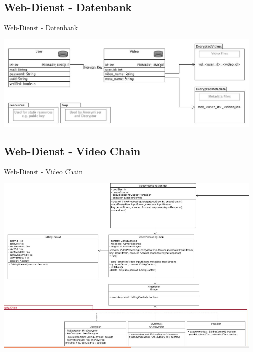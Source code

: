 \documentclass[19pt]{beamer}
\begin{document}
\subsection{Web-Dienst - Datenbank}
\begin{frame}{Web-Dienst - Datenbank}
\begin{center}
\includegraphics[scale=0.3]{resources/database_scheme.jpg}
\end{center}
\end{frame}
\subsection{Web-Dienst - Video Chain}
\begin{frame}{Web-Dienst - Video Chain}
\begin{center}
\includegraphics[scale=0.3]{resources/service_vidchain.png}
\end{center}
\end{frame}

\end{document}

